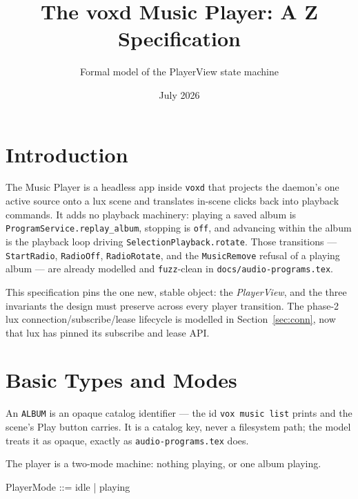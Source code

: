 \documentclass[a4paper,10pt,fleqn]{article}
\begin{document}
\title{The voxd Music Player: A Z Specification}
\author{Formal model of the PlayerView state machine}
\date{July 2026}
\maketitle

\section{Introduction}

The Music Player is a headless app inside \texttt{voxd} that projects the
daemon's one active source onto a lux scene and translates in-scene clicks back
into playback commands. It adds no playback machinery: playing a saved album is
\texttt{ProgramService.replay\_album}, stopping is \texttt{off}, and advancing
within the album is the playback loop driving \texttt{SelectionPlayback.rotate}.
Those transitions --- \texttt{StartRadio}, \texttt{RadioOff},
\texttt{RadioRotate}, and the \texttt{MusicRemove} refusal of a playing album ---
are already modelled and \texttt{fuzz}-clean in \texttt{docs/audio-programs.tex}.

This specification pins the one new, stable object: the \emph{PlayerView}, and
the three invariants the design must preserve across every player transition.
The phase-2 lux connection/subscribe/lease lifecycle is modelled in
Section~\ref{sec:conn}, now that lux has pinned its subscribe and lease API.

\section{Basic Types and Modes}

An \texttt{ALBUM} is an opaque catalog identifier --- the id \texttt{vox music
list} prints and the scene's Play button carries. It is a catalog key, never a
filesystem path; the model treats it as opaque, exactly as
\texttt{audio-programs.tex} does.

\begin{zed}
  [ALBUM]
\end{zed}

The player is a two-mode machine: nothing playing, or one album playing.

\begin{zed}
  PlayerMode ::= idle | playing
\end{zed}
\end{document}
